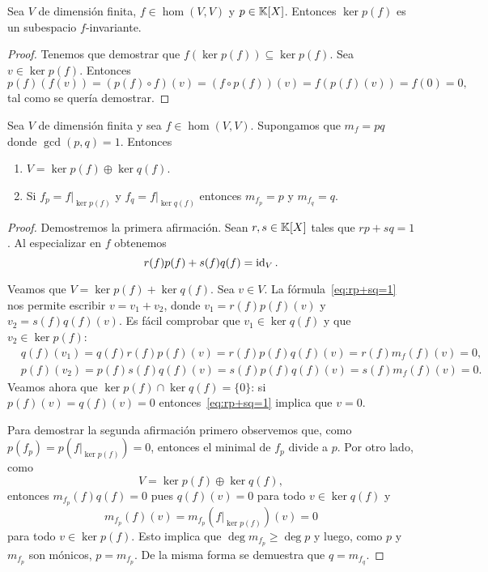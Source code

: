 \begin{lem}
	Sea $V$ de dimensión finita, $f\in\hom(V,V)$ y $p\in\mathbb{K}[X]$. Entonces $\ker
	p(f)$ es un subespacio $f$-invariante. 

	\begin{proof}
		Tenemos que demostrar que $f(\ker p(f))\subseteq\ker p(f)$. Sea
		$v\in\ker p(f)$. Entonces 
		\[
			p(f)\left( f(v)\right)=(p(f)\circ f)(v)=(f\circ p(f))(v)=f\left(p(f)(v)\right)=f(0)=0,
		\]
		tal como se quería demostrar.
	\end{proof}
\end{lem}

\begin{lem}
	\label{lem:V=kerp+kerq}
	Sea $V$ de dimensión finita y sea $f\in\hom(V,V)$. Supongamos que $m_f=pq$
	donde $\gcd(p,q)=1$. Entonces
	\begin{enumerate}
		\item $V=\ker p(f)\oplus \ker q(f)$.
		\item Si $f_p=f|_{\ker p(f)}$ y $f_q=f|_{\ker q(f)}$ entonces
			$m_{f_p}=p$ y $m_{f_q}=q$.
	\end{enumerate}

	\begin{proof}
		Demostremos la primera afirmación. Sean $r,s\in\mathbb{K}[X]$ tales que
		$rp+sq=1$. Al especializar en $f$ obtenemos
		\begin{equation}
			\label{eq:rp+sq=1}
			r(f)p(f)+s(f)q(f)=\operatorname{id}_V.
		\end{equation}
		
		Veamos que $V=\ker p(f)+\ker q(f)$. Sea $v\in V$. La
		fórmula~\eqref{eq:rp+sq=1} nos permite escribir $v=v_1+v_2$, donde
		$v_1=r(f)p(f)(v)$ y $v_2=s(f)q(f)(v)$. Es fácil comprobar que
		$v_1\in\ker q(f)$ y que $v_2\in\ker p(f)$:
		\begin{align*}
			&q(f)(v_1)=q(f)r(f)p(f)(v)=r(f)p(f)q(f)(v)=r(f)m_f(f)(v)=0,\\
			&p(f)(v_2)=p(f)s(f)q(f)(v)=s(f)p(f)q(f)(v)=s(f)m_f(f)(v)=0.
		\end{align*}
		Veamos ahora que $\ker p(f)\cap\ker q(f)=\{0\}$: si $p(f)(v)=q(f)(v)=0$
		entonces~\eqref{eq:rp+sq=1} implica que $v=0$. 

		Para demostrar la segunda afirmación primero observemos que, como
		$p(f_p)=p(f|_{\ker p(f)})=0$, entonces el minimal de $f_p$ divide a
		$p$. Por otro lado, como 
		\[
			V=\ker p(f)\oplus \ker q(f),
		\]
		entonces 
		$m_{f_p}(f)q(f)=0$ pues $q(f)(v)=0$ para todo $v\in\ker q(f)$ y 
		\[
			m_{f_p}(f)(v)=m_{f_p}(f|_{\ker p(f)})(v)=0
		\]
		para todo $v\in\ker p(f)$. 
		Esto implica que $\deg m_{f_p}\geq\deg p$
		y luego, como $p$ y $m_{f_p}$ son mónicos, $p=m_{f_p}$. De la misma
		forma se demuestra que $q=m_{f_q}$. 
	\end{proof}
\end{lem}

